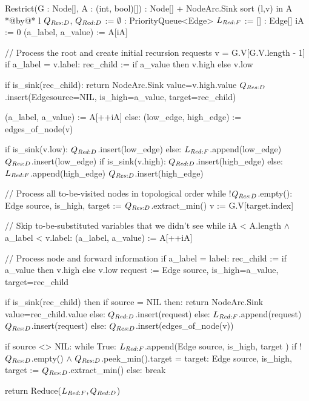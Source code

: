 \begin{blstlisting}
  Restrict(G : Node[], A : (int, bool)[]) : Node[] + NodeArc.Sink
    sort (l,v) in A *@by@* l
    $\RestrictQrec$, $\ReduceQdep$ := $\emptyset$ : PriorityQueue<Edge>
    $\ReduceLforward$ := [] : Edge[]
    iA := 0
    (a_label, a_value) := A[iA]

    // Process the root and create initial recursion requests
    v = G.V[G.V.length - 1]
    if a_label = v.label:
      rec_child := if a_value then v.high else v.low

      if is_sink(rec_child): return NodeArc.Sink{ value=v.high.value }
      $\RestrictQrec$.insert(Edge{source=NIL, is_high=a_value, target=rec_child})

      (a_label, a_value) := A[++iA]
    else:
      (low_edge, high_edge) := edges_of_node(v)

      if is_sink(v.low): $\ReduceQdep$.insert(low_edge)
      else: $\ReduceLforward$.append(low_edge)
            $\RestrictQrec$.insert(low_edge)
      if is_sink(v.high): $\ReduceQdep$.insert(high_edge)
      else: $\ReduceLforward$.append(high_edge)
            $\RestrictQrec$.insert(high_edge)

    // Process all to-be-visited nodes in topological order
    while !$\RestrictQrec$.empty():
      Edge{ source, is_high, target } := $\RestrictQrec$.extract_min()
      v := G.V[target.index]

      // Skip to-be-substituted variables that we didn't see
      while iA < A.length $\land$ a_label < v.label:
        (a_label, a_value) := A[++iA]

      // Process node and forward information
      if a_label = label:
        rec_child := if a_value then v.high else v.low
        request := Edge{ source, is_high=a_value, target=rec_child }

        if is_sink(rec_child)
        then if source = NIL
          then: return NodeArc.Sink{ value=rec_child.value }
          else: $\ReduceQdep$.insert(request)
        else: $\ReduceLforward$.append(request)
              $\RestrictQrec$.insert(request)
      else:
        $\RestrictQrec$.insert(edges_of_node(v))

        if source <> NIL:
          while True:
            $\ReduceLforward$.append(Edge{ source, is_high, target })
            if !$\RestrictQrec$.empty() $\land$ $\RestrictQrec$.peek_min().target = target:
              Edge{ source, is_high, target } := $\RestrictQrec$.extract_min()
            else: break

    return Reduce($\ReduceLforward, \ReduceQdep$)
\end{blstlisting}
